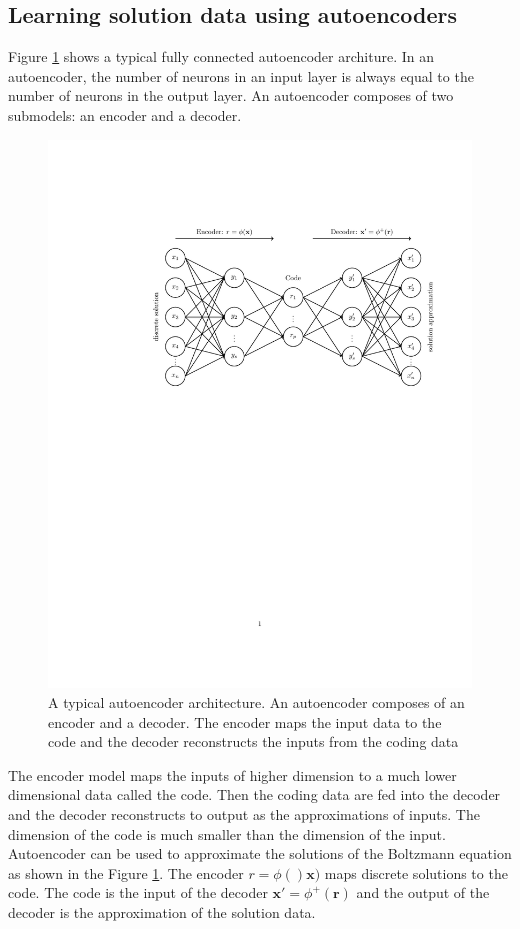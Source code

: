\documentclass{article}
\begin{document}
\subsection{Learning solution data using autoencoders} \label{ae}
Figure \ref{fig:ae} shows a typical fully connected autoencoder architure. In an autoencoder, the number of neurons in an input layer is always equal to the number of neurons in the output layer. An autoencoder composes of two submodels: an encoder and a decoder.
\begin{figure}
\centering
\includegraphics[width=1.0\textwidth]{Autoencoder.pdf}
\caption{A typical autoencoder architecture. An autoencoder composes of an encoder and a decoder. The encoder maps the input data to the code and the decoder reconstructs the inputs from the coding data}
\label{fig:ae}
\end{figure} 
The encoder model maps the inputs of higher dimension to a much lower dimensional data called the code. Then the coding data are fed into the decoder and the decoder reconstructs to output as the approximations of  inputs. The dimension of the code is much smaller than the dimension of the input. Autoencoder can be used to approximate the solutions of the Boltzmann equation as shown in the Figure \ref{fig:ae}. The encoder $r = \phi()\mathbf{x})$ maps discrete solutions to the code. The code is the input of the decoder $\mathbf{x'}=\phi^+(\mathbf{r})$ and the output of the decoder is the approximation of the solution data.
\end{document}
